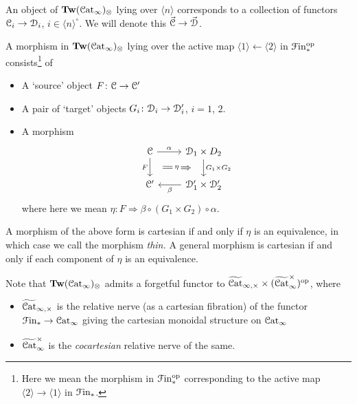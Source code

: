 \documentclass[main.tex]{subfiles}
\begin{document}
\begin{example}
  An object of $\mathbf{Tw}(\mathcal{C}\mathrm{at}_{\infty})_{\otimes}$ lying over $\langle n \rangle$ corresponds to a collection of functors $\mathcal{C}_{i} \to \mathcal{D}_{i}$, $i \in \langle n \rangle^{\circ}$. We will denote this $\vec{\mathcal{C}} \to \vec{\mathcal{D}}$.

  A morphism in $\mathbf{Tw}(\mathcal{C}\mathrm{at}_{\infty})_{\otimes}$ lying over the active map $\langle 1 \rangle \leftarrow \langle 2 \rangle$ in $\mathcal{F}\mathrm{in}_{*}^{\mathrm{op}}$ consists\footnote{Here we mean the morphism in $\mathcal{F}\mathrm{in}_{*}^{\mathrm{op}}$ corresponding to the active map $\langle 2 \rangle \to \langle 1 \rangle$ in $\mathcal{F}\mathrm{in}_{*}$.} of
  \begin{itemize}
    \item A `source' object $F\colon \mathcal{C} \to \mathcal{C}'$

    \item A pair of `target' objects $G_{i}\colon \mathcal{D}_{i} \to \mathcal{D}'_{i}$, $i = 1$, $2$.

    \item A morphism
      \begin{equation*}
        \begin{tikzcd}
          \category{C}
          \arrow[r, "\alpha"]
          \arrow[d, ""{name=L, right}, "F"{left}]
          & \category{D}_{1} \times D_{2}
          \arrow[d, ""{name=R, left}, "G_{1} \times G_{2}"{right}]
          \\
          \category{C}'
          & \category{D}'_{1} \times \category{D}'_{2}
          \arrow[l, "\beta"]
          \arrow[Rightarrow, from=L, to=R, shorten=2ex, "\eta"{description}]
        \end{tikzcd}
      \end{equation*}
      where here we mean $\eta\colon F \Rightarrow \beta \circ (G_{1} \times G_{2}) \circ \alpha$.
  \end{itemize}

  A morphism of the above form is cartesian if and only if $\eta$ is an equivalence, in which case we call the morphism \emph{thin.} A general morphism is cartesian if and only if each component of $\eta$ is an equivalence.
\end{example}

Note that $\mathbf{Tw}(\mathcal{C}\mathrm{at}_{\infty})_{\otimes}$ admits a forgetful functor to $\widetilde{\mathcal{C}\mathrm{at}}_{\infty,\times} \times (\widetilde{\mathcal{C}\mathrm{at}}_{\infty}^{\times})^{\mathrm{op}}$, where
\begin{itemize}
  \item $\widetilde{\mathcal{C}\mathrm{at}}_{\infty,\times}$ is the relative nerve (as a cartesian fibration) of the functor $\mathcal{F}\mathrm{in}_{*} \to \mathcal{C}\mathrm{at}_{\infty}$ giving the cartesian monoidal structure on $\mathcal{C}\mathrm{at}_{\infty}$

  \item $\widetilde{\mathcal{C}\mathrm{at}}_{\infty}^{\times}$ is the \emph{cocartesian} relative nerve of the same.
\end{itemize}
\end{document}
